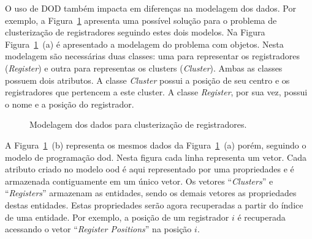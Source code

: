 O uso de DOD também impacta em diferenças na modelagem dos dados. Por exemplo, a Figura~\ref{fig:modelo_register_clustering} apresenta uma possível solução para o problema de clusterização de registradores seguindo estes dois modelos.
Na Figura Figura~\ref{fig:modelo_register_clustering}~(a) é apresentado a modelagem do problema com objetos. Nesta modelagem são necessárias duas classes: uma para representar os registradores (\textit{Register}) e outra para representas os clusters (\textit{Cluster}). Ambas as classes possuem dois atributos. A classe \textit{Cluster} possui a posição de seu centro e os registradores que pertencem a este cluster. A classe \textit{Register}, por sua vez, possui o nome e a posição do registrador.

\begin{figure}[hb]
    \centering
    \caption{Modelagem dos dados para clusterização de registradores.}
    \label{fig:modelo_register_clustering}
\end{figure}


A Figura~\ref{fig:modelo_register_clustering}~(b) representa os mesmos dados da Figura~\ref{fig:modelo_register_clustering}~(a) porém, seguindo o modelo de programação \ac{dod}.
Nesta figura cada linha representa um vetor.
Cada atributo criado no modelo \ac{ood} é aqui representado por uma propriedades e é armazenada contiguamente em um único vetor.
Os vetores ``\textit{Clusters}'' e ``\textit{Registers}'' armazenam as entidades, sendo os demais vetores as propriedades destas entidades.
Estas propriedades serão agora recuperadas a partir do índice de uma entidade.
Por exemplo, a posição de um registrador $i$ é recuperada acessando o vetor ``\textit{Register Positions}'' na posição $i$.

